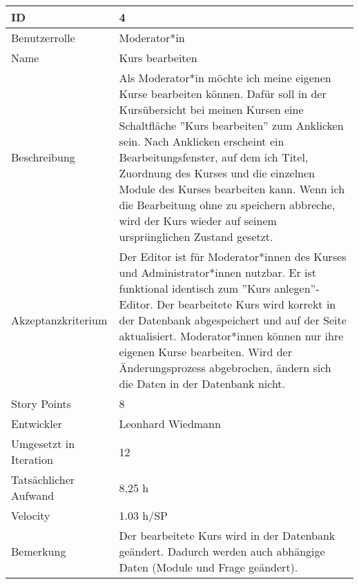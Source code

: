 \begin{tabularx}{\textwidth}{|p{}|X|}
	\hline
	ID & 4\\
	\hline
	Benutzerrolle & Moderator*in\\
	\hline
	Name & Kurs bearbeiten\\
	\hline
	Beschreibung & Als Moderator*in möchte ich meine eigenen Kurse bearbeiten können. Dafür soll in der Kursübersicht bei meinen Kursen eine Schaltfläche ''Kurs bearbeiten'' zum Anklicken sein. Nach Anklicken erscheint ein Bearbeitungsfenster, auf dem ich Titel, Zuordnung des Kurses und die einzelnen Module des Kurses bearbeiten kann. Wenn ich die Bearbeitung ohne zu speichern abbreche, wird der Kurs wieder auf seinem ursprünglichen Zustand gesetzt.\\
	\hline
	Akzeptanzkriterium & Der Editor ist für Moderator*innen des Kurses und Administrator*innen nutzbar. Er ist funktional identisch zum ''Kurs anlegen''-Editor. Der bearbeitete Kurs wird korrekt in der Datenbank abgespeichert und auf der Seite aktualisiert. Moderator*innen können nur ihre eigenen Kurse bearbeiten. Wird der Änderungsprozess abgebrochen, ändern sich die Daten in der Datenbank nicht.\\
	\hline
	Story Points & 8 \\
	\hline
	Entwickler & Leonhard Wiedmann \\
	\hline
	Umgesetzt in Iteration & 12\\
	\hline
	Tatsächlicher Aufwand & 8,25 h \\
	\hline
	Velocity & 1.03 h/SP \\
	\hline
	Bemerkung & Der bearbeitete Kurs wird in der Datenbank geändert. Dadurch werden auch abhängige Daten (Module und Frage geändert).\\
	\hline
\end{tabularx}
\vspace{20pt}
